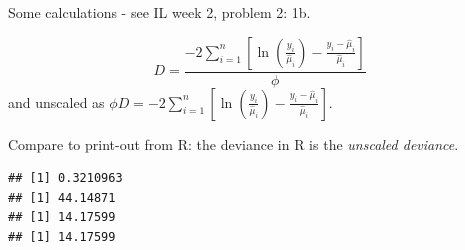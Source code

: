 \documentclass[
  ignorenonframetext,
]{beamer}
\newenvironment{Shaded}{\begin{snugshade}}{\end{snugshade}}
\newcommand{\AttributeTok}[1]{\textcolor[rgb]{0.13,0.29,0.53}{#1}}
\newcommand{\DecValTok}[1]{\textcolor[rgb]{0.00,0.00,0.81}{#1}}
\newcommand{\FunctionTok}[1]{\textcolor[rgb]{0.13,0.29,0.53}{\textbf{#1}}}
\newcommand{\NormalTok}[1]{#1}
\newcommand{\SpecialCharTok}[1]{\textcolor[rgb]{0.81,0.36,0.00}{\textbf{#1}}}
\begin{document}
\begin{frame}[fragile]
Some calculations - see IL week 2, problem 2: 1b.

\[D=\frac{-2 \sum_{i=1}^n [\ln (\frac{y_i}{\hat{\mu}_i})-\frac{y_i-\hat{\mu}_i}{\hat{\mu}_i}]}{\phi}\]
and unscaled as
\(\phi D=-2 \sum_{i=1}^n [\ln (\frac{y_i}{\hat{\mu}_i})-\frac{y_i-\hat{\mu}_i}{\hat{\mu}_i}]\).

Compare to print-out from R: the deviance in R is the \emph{unscaled
deviance}.

\begin{Shaded}
\end{Shaded}

\begin{verbatim}
## [1] 0.3210963
## [1] 44.14871
## [1] 14.17599
## [1] 14.17599
\end{verbatim}
\end{frame}
\end{document}
